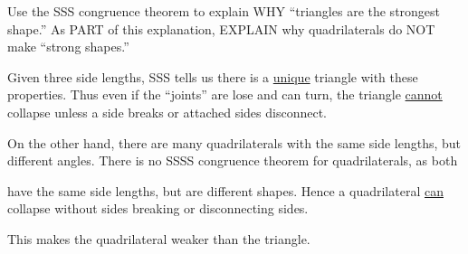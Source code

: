 \documentclass[noauthor,nooutcomes,handout,12pt]{ximera}
\begin{document}
\begin{question}
  Use the SSS congruence theorem to explain WHY ``triangles are the
  strongest shape.''  As PART of this explanation, EXPLAIN why
  quadrilaterals do NOT make ``strong shapes.''
  \begin{freeResponse}
    Given three side lengths, SSS tells us there is a
    \underline{unique} triangle with these properties. Thus even if
    the ``joints'' are lose and can turn, the triangle
    \underline{cannot} collapse unless a side breaks or attached
    sides disconnect.

    
    On the other hand, there are many quadrilaterals with the same
    side lengths, but different angles. There is no SSSS congruence
    theorem for quadrilaterals, as both

    \begin{center}
    \end{center}
    have the same side lengths, but are different shapes. Hence a
    quadrilateral \underline{can} collapse without sides breaking or
    disconnecting sides.

    This makes the quadrilateral weaker than the triangle.
  \end{freeResponse}
\end{question}
\end{document}
